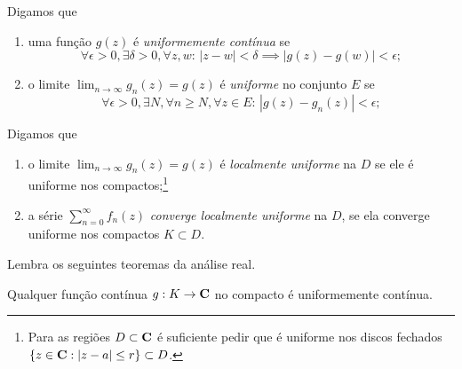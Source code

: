 \begin{defin}
Digamos que 
\begin{enumerate}
\item uma função $g(z)$ é \emph{uniformemente contínua} se
\[ \forall \epsilon>0, \exists \delta>0, \forall z,w: \, |z-w|<\delta \implies |g(z)-g(w)|<\epsilon; \]
\item o limite $\lim_{n\to\infty} g_n(z) = g(z)$ é \emph{uniforme} no conjunto $E$ se
\[ \forall \epsilon>0, \exists N, \forall n\geq N,\forall z\in E:\, |g(z)-g_n(z)|<\epsilon; \]
\end{enumerate}
\end{defin}

\begin{defin}
Digamos que 
\begin{enumerate}
\item o limite $\lim_{n\to\infty} g_n(z) = g(z)$ é \emph{localmente uniforme} na $D$
se ele é uniforme nos compactos;\footnote{Para as regiões $D\subset \mathbf{C}$ é suficiente pedir que é
uniforme nos discos fechados $\{ z\in\mathbf{C} : |z-a|\leq r \} \subset D$.}
\item a série $\sum_{n=0}^\infty f_n(z)$ \emph{converge localmente uniforme} na $D$,
se ela converge uniforme nos compactos $K\subset D$.
\end{enumerate}
\end{defin}


Lembra os seguintes teoremas da análise real.

\begin{teorema}
Qualquer função contínua $g : K \to \mathbf{C}$ no compacto é uniformemente contínua.
\end{teorema}

